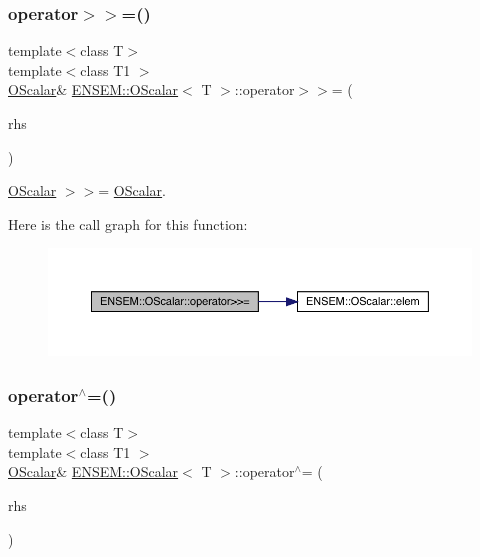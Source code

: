 \subsubsection{\texorpdfstring{operator$>$$>$=()}{operator>>=()}\hspace{0.1cm}{\footnotesize\ttfamily [2/2]}}
{\footnotesize\ttfamily template$<$class T$>$ \\
template$<$class T1 $>$ \\
\mbox{\hyperlink{classENSEM_1_1OScalar}{O\+Scalar}}\& \mbox{\hyperlink{classENSEM_1_1OScalar}{E\+N\+S\+E\+M\+::\+O\+Scalar}}$<$ T $>$\+::operator$>$$>$= (\begin{DoxyParamCaption}\item[{const \mbox{\hyperlink{classENSEM_1_1OScalar}{O\+Scalar}}$<$ T1 $>$ \&}]{rhs }\end{DoxyParamCaption})\hspace{0.3cm}{\ttfamily [inline]}}



\mbox{\hyperlink{classENSEM_1_1OScalar}{O\+Scalar}} $>$$>$= \mbox{\hyperlink{classENSEM_1_1OScalar}{O\+Scalar}}. 

Here is the call graph for this function\+:
\nopagebreak
\begin{figure}[H]
\begin{center}
\leavevmode
\includegraphics[width=350pt]{da/d80/classENSEM_1_1OScalar_a38ab5a0779184c6ca5a1b3211e2e38ca_cgraph}
\end{center}
\end{figure}
\mbox{\label{classENSEM_1_1OScalar_af66decef8e6be220193ad1292a927e2f}} 
\subsubsection{\texorpdfstring{operator$^\wedge$=()}{operator^=()}\hspace{0.1cm}{\footnotesize\ttfamily [1/2]}}
{\footnotesize\ttfamily template$<$class T$>$ \\
template$<$class T1 $>$ \\
\mbox{\hyperlink{classENSEM_1_1OScalar}{O\+Scalar}}\& \mbox{\hyperlink{classENSEM_1_1OScalar}{E\+N\+S\+E\+M\+::\+O\+Scalar}}$<$ T $>$\+::operator$^\wedge$= (\begin{DoxyParamCaption}\item[{const \mbox{\hyperlink{classENSEM_1_1OScalar}{O\+Scalar}}$<$ T1 $>$ \&}]{rhs }\end{DoxyParamCaption})\hspace{0.3cm}{\ttfamily [inline]}}



